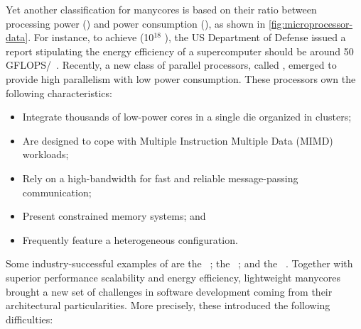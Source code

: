 	Yet another classification for manycores is based on
	their ratio between processing power (\flops) and power consumption
	(\watts), as shown in \autoref{fig:microprocessor-data}.  For
	instance, to achieve \exascale (10$^{18}$ \flops), the US Department
	of Defense issued a report stipulating the energy efficiency of a
	supercomputer should be around 50
	GFLOPS/\watts~\cite{darpa:exascale}.  Recently, a new class of
	parallel processors, called \lightweight \manycores, emerged to
	provide high parallelism with low power consumption.  These
	processors own the following characteristics:

	\begin{itemize}
		\item Integrate thousands of low-power cores in a single die organized in clusters;
		\item Are designed to cope with Multiple Instruction Multiple
		Data (MIMD) workloads;
		\item Rely on a high-bandwidth \noc for fast and reliable message-passing communication;
		\item Present constrained memory systems; and
		\item Frequently feature a heterogeneous configuration.
	\end{itemize}



	Some industry-successful examples of \lightweight \manycores are the
	\mppa~\cite{DeDinechin2013-1}; the \epiphany~\cite{olofsson2014};
	and the \taihulight~\cite{zheng2015}.  Together with superior performance
	scalability and energy efficiency, lightweight manycores brought a new
	set of challenges in software development coming from their
	architectural particularities.  More precisely, these 
	introduced the following difficulties:

